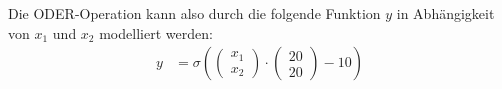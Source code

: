 \begin{flushleft}
Die ODER-Operation kann also durch die folgende Funktion $y$ in Abhängigkeit von $x_1$ und $x_2$ modelliert werden:
\begin{align}
    y&=\sigma\left(\begin{pmatrix}
        x_1 \\
        x_2
    \end{pmatrix}\cdot
    \begin{pmatrix}
        20 \\
        20
    \end{pmatrix}-10\right)
\end{align}
\end{flushleft}
